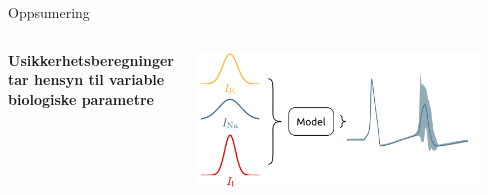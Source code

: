 \documentclass[presentation]{beamer}
\begin{document}
\begin{frame}{Oppsumering}
\pause
\begin{columns}
  \begin{center}
      \raggedright
   \bf{Usikkerhetsberegninger tar hensyn til variable biologiske parametre}
  \end{center}
     \begin{center}
            \includegraphics[width=0.9\textwidth]{probabalistic_no_uncertainpy.png}
     \end{center}

 \end{columns}




\pause
{}



\end{frame}
\end{document}
